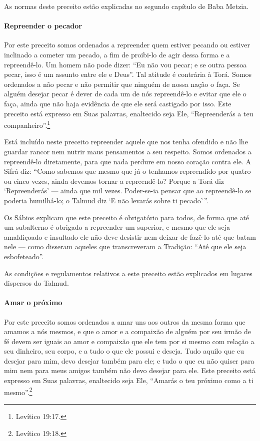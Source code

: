 As normas deste preceito estão explicadas no segundo capítulo de Baba
Metzia.

\paragraph{Repreender o pecador}

Por este preceito somos ordenados a repreender quem estiver pecando ou
estiver inclinado a cometer um pecado, a fim de proibi-lo de agir dessa
forma e a repreendê-lo. Um homem não pode dizer: ``Eu não vou pecar; e
se outra pessoa pecar, isso é um assunto entre ele e Deus''. Tal atitude
é contrária à Torá. Somos ordenados a não pecar e não permitir que
ninguém de nossa nação o faça. Se alguém desejar pecar é dever de cada
um de nós repreendê-lo e evitar que ele o faça, ainda que não haja
evidência de que ele será castigado por isso. Este preceito está
expresso em Suas palavras, enaltecido seja Ele, ``Repreenderás a teu
companheiro''.\footnote{Levítico 19:17.}

Está incluído neste preceito repreender aquele que nos tenha ofendido e
não lhe guardar rancor nem nutrir maus pensamentos a seu respeito. Somos
ordenados a repreendê-lo diretamente, para que nada perdure em nosso
coração contra ele. A Sifrá diz: ``Como sabemos que mesmo que já o
tenhamos repreendido por quatro ou cinco vezes, ainda devemos tornar a
repreendê-lo? Porque a Torá diz `Repreenderás' --- ainda que mil vezes.
Poder-se-ia pensar que ao repreendê-lo se poderia humilhá-lo; o Talmud
diz `E não levarás sobre ti pecado'\,''.

Os Sábios explicam que este preceito é obrigatório para todos, de forma
que até um subalterno é obrigado a repreender um superior, e mesmo que
ele seja amaldiçoado e insultado ele não deve desistir nem deixar de
fazê-lo até que batam nele --- como disseram aqueles que transcreveram a
Tradição: ``Até que ele seja esbofeteado''.

As condições e regulamentos relativos a este preceito estão explicados
em lugares dispersos do Talmud.

\paragraph{Amar o próximo}

Por este preceito somos ordenados a amar uns aos outros da mesma forma
que amamos a nós mesmos, e que o amor e a compaixão de alguém por seu
irmão de fé devem ser iguais ao amor e compaixão que ele tem por si
mesmo com relação a seu dinheiro, seu corpo, e a tudo o que ele possui e
deseja. Tudo aquilo que eu desejar para mim, devo desejar também para
ele; e tudo o que eu não quiser para mim nem para meus amigos também não
devo desejar para ele. Este preceito está expresso em Suas palavras,
enaltecido seja Ele, ``Amarás o teu próximo como a ti mesmo''.\footnote{Levítico
19:18.}

